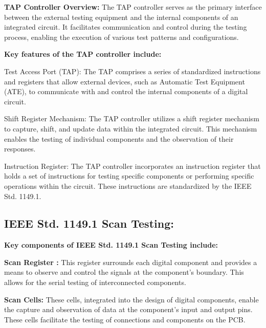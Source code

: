 \textbf{TAP Controller Overview:}
The TAP controller serves as the primary interface between the external testing equipment and the internal components of an integrated circuit. It facilitates communication and control during the testing process, enabling the execution of various test patterns and configurations.
\vspace{2mm}

\textbf{Key features of the TAP controller include:}
\vspace{2mm}

\hspace{4mm} Test Access Port (TAP): The TAP comprises a series of standardized instructions and registers that allow external devices, such as Automatic Test Equipment (ATE), to communicate with and control the internal components of a digital circuit.
\vspace{2mm}

\hspace{4mm}Shift Register Mechanism: The TAP controller utilizes a shift register mechanism to capture, shift, and update data within the integrated circuit. This mechanism enables the testing of individual components and the observation of their responses.
\vspace{2mm}

\hspace{4mm}Instruction Register: The TAP controller incorporates an instruction register that holds a set of instructions for testing specific components or performing specific operations within the circuit. These instructions are standardized by the IEEE Std. 1149.1.
\vspace{2mm}
\newpage
\subsection{IEEE Std. 1149.1 Scan Testing:}

\textbf{Key components of IEEE Std. 1149.1 Scan Testing include:}
\vspace{2mm}

\textbf{Scan Register :} This register surrounds each digital component and provides a means to observe and control the signals at the component's boundary. This allows for the serial testing of interconnected components.
\vspace{2mm}

\textbf{Scan Cells:} These cells, integrated into the design of digital components, enable the capture and observation of data at the component's input and output pins. These cells facilitate the testing of connections and components on the PCB.
\vspace{2mm}

